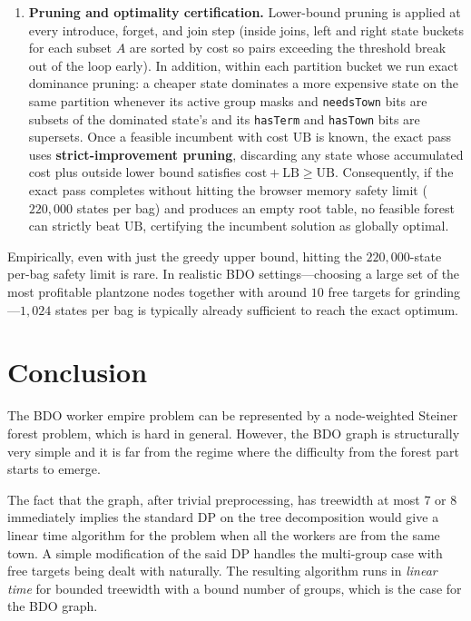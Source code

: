 \documentclass[11pt]{article}
\theoremstyle{definition}
\theoremstyle{remark}
\begin{document}
\begin{enumerate}
    \item[$\bullet$] \textbf{Pruning and optimality certification.} Lower-bound pruning is applied at every introduce, forget, and join step (inside joins, left and right state buckets for each subset $A$ are sorted by cost so pairs exceeding the threshold break out of the loop early). In addition, within each partition bucket we run exact dominance pruning: a cheaper state dominates a more expensive state on the same partition whenever its active group masks and \texttt{needsTown} bits are subsets of the dominated state's and its \texttt{hasTerm} and \texttt{hasTown} bits are supersets. Once a feasible incumbent with cost $\mathrm{UB}$ is known, the exact pass uses \textbf{strict-improvement pruning}, discarding any state whose accumulated cost plus outside lower bound satisfies $\mathrm{cost} + \mathrm{LB} \ge \mathrm{UB}$. Consequently, if the exact pass completes without hitting the browser memory safety limit ($220{,}000$ states per bag) and produces an empty root table, no feasible forest can strictly beat $\mathrm{UB}$, certifying the incumbent solution as globally optimal.
\end{enumerate}

Empirically, even with just the greedy upper bound, hitting the $220{,}000$-state per-bag safety limit is rare. In realistic BDO settings---choosing a large set of the most profitable plantzone nodes together with around $10$ free targets for grinding---$1{,}024$ states per bag is typically already sufficient to reach the exact optimum. %





\section{Conclusion}
The BDO worker empire problem can be represented by a node-weighted Steiner forest problem, which is hard in general. However, the BDO graph is structurally very simple and it is far from the regime where the difficulty from the forest part starts to emerge.

The fact that the graph, after trivial preprocessing, has treewidth at most 7 or 8 immediately implies the standard DP on the tree decomposition would give a linear time algorithm for the problem when all the workers are from the same town. A simple modification of the said DP handles the multi-group case with free targets being dealt with naturally. The resulting algorithm runs in \textit{linear time} for bounded treewidth with a bound number of groups, which is the case for the BDO graph.
\end{document}
